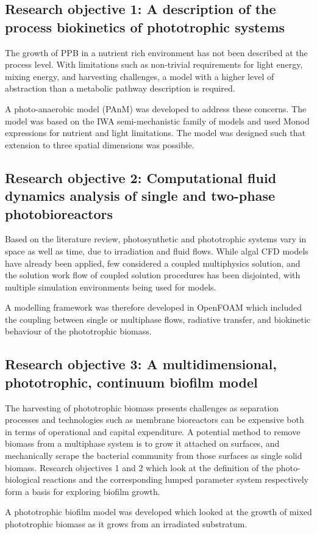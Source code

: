 \subsection{Research objective 1: A description of the process biokinetics of phototrophic systems}
The growth of PPB in a nutrient rich environment has not been described at the process level. With limitations such as non-trivial requirements for light energy, mixing energy, and harvesting challenges, a model with a higher level of abstraction than a metabolic pathway description is required.

A photo-anaerobic model (PAnM) was developed to address these concerns. The model was based on the IWA semi-mechanistic family of models and used Monod expressions for nutrient and light limitations. The model was designed such that extension to three spatial dimensions was possible. 

\subsection{Research objective 2: Computational fluid dynamics analysis of single and two-phase photobioreactors}
Based on the literature review, photosynthetic and phototrophic systems vary in space as well as time, due to irradiation and fluid flows. While algal CFD models have already been applied, few considered a coupled multiphysics solution, and the solution work flow of coupled solution procedures has been disjointed, with multiple simulation environments being used for models. 


A modelling framework was therefore developed in OpenFOAM which included the coupling between single or multiphase flows, radiative transfer, and biokinetic behaviour of the phototrophic biomass.

\subsection{Research objective 3: A multidimensional, phototrophic, continuum biofilm model}
The harvesting of phototrophic biomass presents challenges as separation processes and technologies such as membrane bioreactors can be expensive both in terms of operational and capital expenditure. A potential method to remove biomass from a multiphase system is to grow it attached on surfaces, and mechanically scrape the bacterial community from those surfaces as single solid biomass. Research objectives 1 and 2 which look at the definition of the photo-biological reactions and the corresponding lumped parameter system respectively form a basis for exploring biofilm growth. 

A phototrophic biofilm model was developed which looked at the growth of mixed phototrophic biomass as it grows from an irradiated substratum. 





